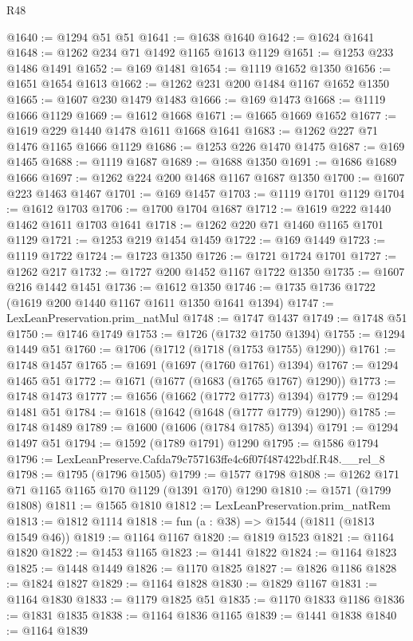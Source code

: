 \begin{lexlean}{R48}
\begin{coremodule}
@1640 := @1294 @51 @51
@1641 := @1638 @1640
@1642 := @1624 @1641
@1648 := @1262 @234 @71 @1492 @1165 @1613 @1129
@1651 := @1253 @233 @1486 @1491
@1652 := @169 @1481
@1654 := @1119 @1652 @1350
@1656 := @1651 @1654 @1613
@1662 := @1262 @231 @200 @1484 @1167 @1652 @1350
@1665 := @1607 @230 @1479 @1483
@1666 := @169 @1473
@1668 := @1119 @1666 @1129
@1669 := @1612 @1668
@1671 := @1665 @1669 @1652
@1677 := @1619 @229 @1440 @1478 @1611 @1668 @1641
@1683 := @1262 @227 @71 @1476 @1165 @1666 @1129
@1686 := @1253 @226 @1470 @1475
@1687 := @169 @1465
@1688 := @1119 @1687
@1689 := @1688 @1350
@1691 := @1686 @1689 @1666
@1697 := @1262 @224 @200 @1468 @1167 @1687 @1350
@1700 := @1607 @223 @1463 @1467
@1701 := @169 @1457
@1703 := @1119 @1701 @1129
@1704 := @1612 @1703
@1706 := @1700 @1704 @1687
@1712 := @1619 @222 @1440 @1462 @1611 @1703 @1641
@1718 := @1262 @220 @71 @1460 @1165 @1701 @1129
@1721 := @1253 @219 @1454 @1459
@1722 := @169 @1449
@1723 := @1119 @1722
@1724 := @1723 @1350
@1726 := @1721 @1724 @1701
@1727 := @1262 @217
@1732 := @1727 @200 @1452 @1167 @1722 @1350
@1735 := @1607 @216 @1442 @1451
@1736 := @1612 @1350
@1746 := @1735 @1736 @1722 (@1619 @200 @1440 @1167 @1611 @1350 @1641 @1394)
@1747 := LexLeanPreservation.prim_natMul
@1748 := @1747 @1437
@1749 := @1748 @51
@1750 := @1746 @1749
@1753 := @1726 (@1732 @1750 @1394)
@1755 := @1294 @1449 @51
@1760 := @1706 (@1712 (@1718 (@1753 @1755) @1290))
@1761 := @1748 @1457
@1765 := @1691 (@1697 (@1760 @1761) @1394)
@1767 := @1294 @1465 @51
@1772 := @1671 (@1677 (@1683 (@1765 @1767) @1290))
@1773 := @1748 @1473
@1777 := @1656 (@1662 (@1772 @1773) @1394)
@1779 := @1294 @1481 @51
@1784 := @1618 (@1642 (@1648 (@1777 @1779) @1290))
@1785 := @1748 @1489
@1789 := @1600 (@1606 (@1784 @1785) @1394)
@1791 := @1294 @1497 @51
@1794 := @1592 (@1789 @1791) @1290
@1795 := @1586 @1794
@1796 := LexLeanPreserve.Cafda79c757163ffe4c6f07f487422bdf.R48.__rel_8
@1798 := @1795 (@1796 @1505)
@1799 := @1577 @1798
@1808 := @1262 @171 @71 @1165 @1165 @170 @1129 (@1391 @170) @1290
@1810 := @1571 (@1799 @1808)
@1811 := @1565 @1810
@1812 := LexLeanPreservation.prim_natRem
@1813 := @1812 @1114
@1818 := fun (a : @38) => @1544 (@1811 (@1813 @1549 @46))
@1819 := @1164 @1167
@1820 := @1819 @1523
@1821 := @1164 @1820
@1822 := @1453 @1165
@1823 := @1441 @1822
@1824 := @1164 @1823
@1825 := @1448 @1449
@1826 := @1170 @1825
@1827 := @1826 @1186
@1828 := @1824 @1827
@1829 := @1164 @1828
@1830 := @1829 @1167
@1831 := @1164 @1830
@1833 := @1179 @1825 @51
@1835 := @1170 @1833 @1186
@1836 := @1831 @1835
@1838 := @1164 @1836 @1165
@1839 := @1441 @1838
@1840 := @1164 @1839

\end{coremodule}
\end{lexlean}
